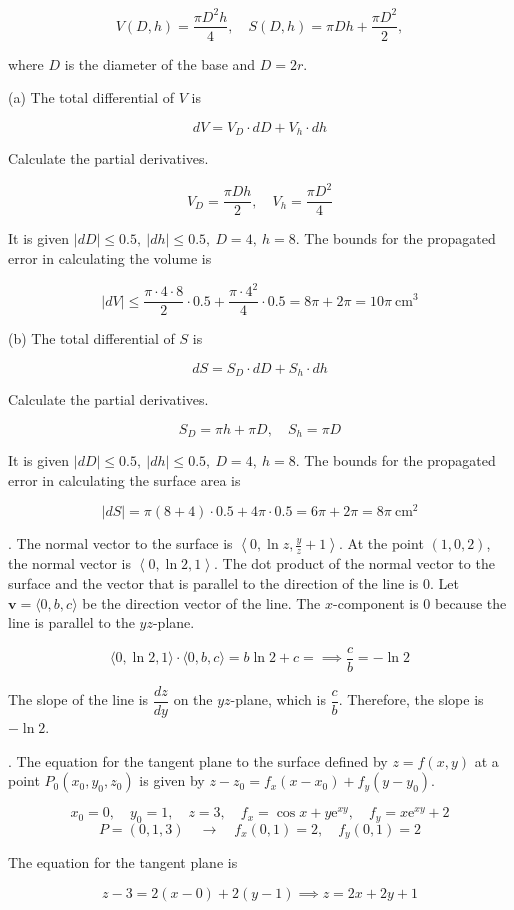 \documentclass{article}
\begin{document}
\[V(D,h)=\frac{\pi D^2h}4,\quad S(D,h)=\pi Dh+\frac{\pi D^2}2,\]

\noindent where $D$ is the diameter of the base and $D=2r$.

\hfill

\noindent (a) The total differential of $V$ is

\[dV=V_D\cdot dD+V_h\cdot dh\]

\hfill

\noindent Calculate the partial derivatives.

\[V_D=\frac{\pi Dh}2,\quad V_h=\frac{\pi D^2}4\]

\hfill

\noindent It is given $\left|dD\right|\leq0.5,\:|dh|\leq0.5,\:D=4,\:h=8$. The bounds for the propagated error in calculating the volume is

\[|dV|\leq\frac{\pi\cdot4\cdot8}2\cdot0.5+\frac{\pi\cdot4^2}4\cdot0.5=8\pi+2\pi=\boxed{10\pi\:\text{cm}^3}\]

\hfill

\noindent (b) The total differential of $S$ is

\[dS=S_D\cdot dD+S_h\cdot dh\]

\hfill

\noindent Calculate the partial derivatives.

\[S_D=\pi h+\pi D,\quad S_h=\pi D\]

\hfill

\noindent It is given $\left|dD\right|\leq0.5,\:|dh|\leq0.5,\:D=4,\:h=8$. The bounds for the propagated error in calculating the surface area is

\[|dS|=\pi\left(8+4\right)\cdot0.5+4\pi\cdot0.5=6\pi+2\pi=\boxed{8\pi\:\text{cm}^2}\]

\hfill

. The normal vector to the surface is $\left\langle0,\ln z,\frac yz+1\right\rangle$. At the point $(1,0,2)$, the normal vector is $\left\langle0,\ln2,1\right\rangle$. The dot product of the normal vector to the surface and the vector that is parallel to the direction of the line is $0$. Let $\mathbf v=\langle 0,b,c\rangle$ be the direction vector of the line. The $x$-component is $0$ because the line is parallel to the $yz$-plane.

\[\langle0,\ln2,1\rangle\cdot\langle0,b,c\rangle=b\ln2+c=\implies \frac cb=-\ln2\]

\hfil

\noindent The slope of the line is $\dfrac{dz}{dy}$ on the $yz$-plane, which is $\dfrac cb$. Therefore, the slope is $\boxed{-\ln2}$.

\hfill

. The equation for the tangent plane to the surface defined by $z=f(x,y)$ at a point $P_0(x_0,y_0,z_0)$ is given by $z-z_0=f_x(x-x_0)+f_y(y-y_0)$.

\[x_0=0,\quad y_0=1,\quad z=3,\quad f_x=\cos x+y\mathrm{e}^{xy},\quad f_y=x\mathrm{e}^{xy}+2\]
\[P=(0,1,3)\quad\rightarrow\quad f_x(0,1)=2,\quad f_y(0,1)=2\]

\hfill

\noindent The equation for the tangent plane is

\[\boxed{z-3=2(x-0)+2(y-1)\implies z=2x+2y+1}\]
\end{document}
